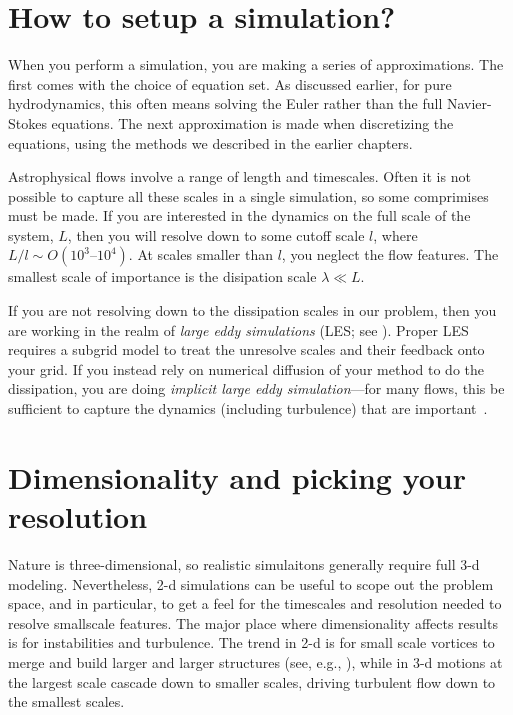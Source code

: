 \section{How to setup a simulation?}

When you perform a simulation, you are making a series of
approximations.  The first comes with the choice of equation set.  As
discussed earlier, for pure hydrodynamics, this often means solving
the Euler rather than the full Navier-Stokes equations.  The next
approximation is made when discretizing the equations, using the 
methods we described in the earlier chapters.  

Astrophysical flows involve a range of length and timescales.  Often
it is not possible to capture all these scales in a single simulation,
so some comprimises must be made.  If you are interested in the
dynamics on the full scale of the system, $L$, then you will resolve
down to some cutoff scale $l$, where $L/l \sim O(10^3\mbox{--}10^4)$.
At scales smaller than $l$, you neglect the flow features.  The
smallest scale of importance is the disipation scale $\lambda \ll L$.

If you are not resolving down to the dissipation scales in our
problem, then you are working in the realm of {\em large eddy
  simulations} (LES; see \cite{schmidt:2014}).  Proper LES requires a
subgrid model to treat the unresolve scales and their feedback onto
your grid.  If you instead rely on numerical diffusion of your method
to do the dissipation, you are doing {\em implicit large eddy
  simulation}---for many flows, this be sufficient to capture the
dynamics (including turbulence) that are important~\cite{aspden:2008}.

\section{Dimensionality and picking your resolution}

Nature is three-dimensional, so realistic simulaitons generally
require full 3-d modeling.  Nevertheless, 2-d simulations can be
useful to scope out the problem space, and in particular, to get a
feel for the timescales and resolution needed to resolve smallscale
features.  The major place where dimensionality affects results is for
instabilities and turbulence.  The trend in 2-d is for small scale
vortices to merge and build larger and larger structures (see, e.g.,
\cite{twodturbulence}), while in 3-d motions at the largest scale
cascade down to smaller scales, driving turbulent flow down to the
smallest scales.

